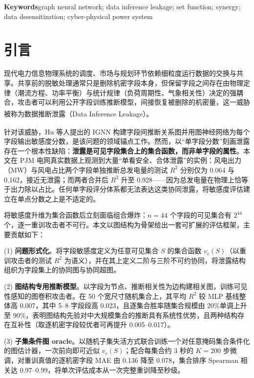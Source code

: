 \documentclass[10.5pt,compsoc,UTF8]{CjC}
\theoremstyle{mystyle}
\newcommand{\upcite}[1]{\textsuperscript{\cite{#1}}}
\begin{document}
{{\bf Keywords}\quad graph neural network; data inference leakage; set function; synergy; data desensitization; cyber-physical power system\par}

\vskip 10mm

\section{\heiti 引言}

现代电力信息物理系统的调度、市场与规划环节依赖细粒度运行数据的交换与共享。共享前的脱敏处理通常只是删除机密字段本身，但保留字段之间存在由物理定律（潮流方程、功率平衡）与统计规律（负荷周期性、气象相关性）决定的强耦合，攻击者可以利用公开字段训练推断模型，间接恢复被删除的机密量，这一威胁被称为数据推断泄露（Data Inference Leakage）\upcite{hu2026ignn}。

针对该威胁，Hu 等人提出的 IGNN\upcite{hu2026ignn} 构建字段间推断关系图并用图神经网络为每个字段输出敏感度分数，是该问题的领域锚点工作。然而，以“单字段分数”刻画泄露存在一个根本性缺陷：\textbf{泄露是可见字段集合上的集合函数，而非单字段的属性}。本文在 PJM 电网真实数据上观测到大量“单看安全、合体泄露”的实例：风电出力（MW）与风电占比两个字段单独推断总发电量的测试 $R^2$ 分别仅为 0.064 与 0.162，接近无泄露；而两者合并后 $R^2$ 升至 0.928——因为总发电量在物理上恰等于出力除以占比。任何单字段评分体系都无法表达这类协同泄露，将敏感度评估建立在单点分数之上是不适定的。

将敏感度升维为集合函数后立刻面临组合爆炸：$n=44$ 个字段的可见集合有 $2^{44}$ 个，逐一重训攻击者不可行。本文以图结构为骨架给出一套可扩展的评估框架，主要贡献如下：

(1) \textbf{问题形式化}。将字段敏感度定义为任意可见集合 $S$ 的集合函数 $v_c(S)$（以重训攻击者的测试 $R^2$ 为语义），并在其上定义二阶与三阶不可约协同，将泄露结构组织为字段集上的协同图与协同超图。

(2) \textbf{图结构专用推断模型}。以字段为节点、推断相关性为边构建相关图，训练可见性感知的图卷积攻击者。在 50 个宽尺寸随机集合上，其平均 $R^2$ 较 MLP 基线整体高 0.007，其中 5--8 字段段高 0.023，且逐集合胜率随集合规模由 20\%单调上升至 90\%，表明图结构先验对中大规模集合的推断具有系统性优势，且两种结构存在互补性（取逐机密字段较优者可再提升 0.005--0.017）。

(3) \textbf{子集条件图 oracle}。以随机子集失活方式联合训练一个对任意掩码集合条件化的图估计器，一次前向即可近似 $v_c(S)$；配合每集合约 3 秒的 $K{=}200$ 步微调，对重训真值的逐机密字段 MAE 由 0.136 降至 0.078，集合排序 Spearman 相关达 0.97--0.99，将单次评估成本从一次完整重训降至秒级。
\end{document}
